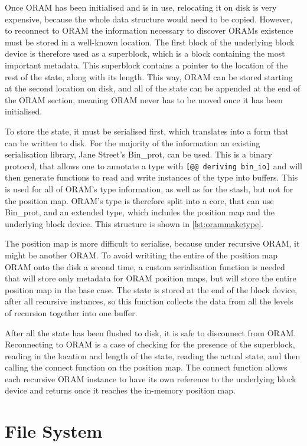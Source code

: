 \documentclass[12pt,a4paper,twoside,openright]{report}
\begin{document}
Once ORAM has been initialised and is in use, relocating it on disk is very expensive, because the whole data structure would need to be copied. However, to reconnect to ORAM the information necessary to discover ORAMs existence must be stored in a well-known location. The first block of the underlying block device is therefore used as a superblock, which is a block containing the most important metadata. This superblock contains a pointer to the location of the rest of the state, along with its length. This way, ORAM can be stored starting at the second location on disk, and all of the state can be appended at the end of the ORAM section, meaning ORAM never has to be moved once it has been initialised.

To store the state, it must be serialised first, which translates into a form that can be written to disk. For the majority of the information an existing serialisation library, Jane Street's Bin\_prot, can be used. This is a binary protocol, that allows one to annotate a type with \texttt{[@@ deriving bin\_io]} and will then generate functions to read and write instances of the type into buffers. This is used for all of ORAM's type information, as well as for the stash, but not for the position map. ORAM's type is therefore split into a core, that can use Bin\_prot, and an extended type, which includes the position map and the underlying block device. This structure is shown in \cref{lst:orammaketype}.

The position map is more difficult to serialise, because under recursive ORAM, it might be another ORAM. To avoid writiting the entire of the position map ORAM onto the disk a second time, a custom serialisation function is needed that will store only metadata for ORAM position maps, but will store the entire position map in the base case. The state is stored at the end of the block device, after all recursive instances, so this function collects the data from all the levels of recursion together into one buffer.

After all the state has been flushed to disk, it is safe to disconnect from ORAM. Reconnecting to ORAM is a case of checking for the presence of the superblock, reading in the location and length of the state, reading the actual state, and then calling the connect function on the position map. The connect function allows each recursive ORAM instance to have its own reference to the underlying block device and returns once it reaches the in-memory position map.

\section{File System}
\label{sec:fileSystem}
\end{document}
